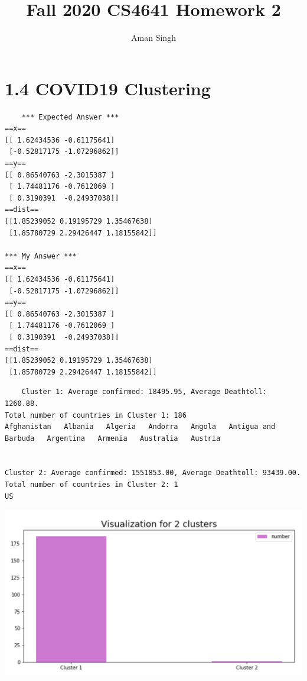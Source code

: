 \documentclass{article}
\title{Fall 2020 CS4641 Homework 2}
\author{Aman Singh}
\begin{document}
\maketitle

\section{1.4 COVID19 Clustering}
\begin{verbatim}
    *** Expected Answer ***
==x==
[[ 1.62434536 -0.61175641]
 [-0.52817175 -1.07296862]]
==y==
[[ 0.86540763 -2.3015387 ]
 [ 1.74481176 -0.7612069 ]
 [ 0.3190391  -0.24937038]]
==dist==
[[1.85239052 0.19195729 1.35467638]
 [1.85780729 2.29426447 1.18155842]]

*** My Answer ***
==x==
[[ 1.62434536 -0.61175641]
 [-0.52817175 -1.07296862]]
==y==
[[ 0.86540763 -2.3015387 ]
 [ 1.74481176 -0.7612069 ]
 [ 0.3190391  -0.24937038]]
==dist==
[[1.85239052 0.19195729 1.35467638]
 [1.85780729 2.29426447 1.18155842]]
\end{verbatim}
\begin{verbatim}
    Cluster 1: Average confirmed: 18495.95, Average Deathtoll: 1260.88.
Total number of countries in Cluster 1: 186
Afghanistan   Albania   Algeria   Andorra   Angola   Antigua and Barbuda   Argentina   Armenia   Australia   Austria   


Cluster 2: Average confirmed: 1551853.00, Average Deathtoll: 93439.00.
Total number of countries in Cluster 2: 1
US   
\end{verbatim}
\includegraphics[scale=0.75]{cluster_graph.png}
\end{document}
